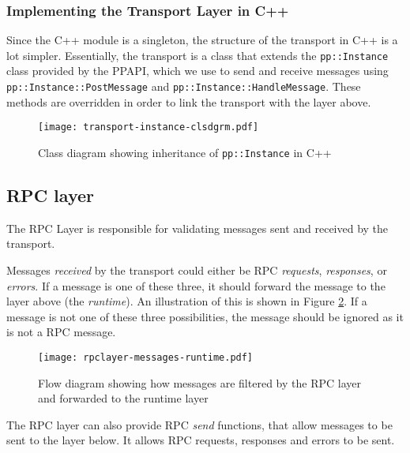 
\subsubsection{Implementing the Transport Layer in C++} %
\label{ssub:implementing_the_transport_layer_in_cpp_}
Since the C++ module is a singleton, the structure of the transport in C++ is a lot simpler. Essentially, the transport is a class that extends the \lstinline{pp::Instance} class provided by the PPAPI, which we use to send and receive messages using \lstinline{pp::Instance::PostMessage} and \lstinline{pp::Instance::HandleMessage}. These methods are overridden in order to link the transport with the layer above.

\begin{figure}
    \centering
    \texttt{[image: transport-instance-clsdgrm.pdf]} 
    \caption{Class diagram showing inheritance of \lstinline{pp::Instance} in C++}
    \label{fig:instance-transport}
\end{figure}




\subsection{RPC layer} %
\label{sub:json_rpc_layer_design}
The RPC Layer is responsible for validating messages sent and received by the transport. 

Messages \emph{received} by the transport could either be RPC \emph{requests}, \emph{responses}, or \emph{errors}. If a message is one of these three, it should forward the message to the layer above (the \emph{runtime}). An illustration of this is shown in Figure \ref{fig:rpclayer_messages_runtime}. If a message is not one of these three possibilities, the message should be ignored as it is not a RPC message.

\begin{figure}
    \centering
    \texttt{[image: rpclayer-messages-runtime.pdf]} 
    \caption{Flow diagram showing how messages are filtered by the RPC layer and forwarded to the runtime layer}
    \label{fig:rpclayer_messages_runtime}
\end{figure}

The RPC layer can also provide RPC \emph{send} functions, that allow messages to be sent to the layer below. It allows RPC requests, responses and errors to be sent.

